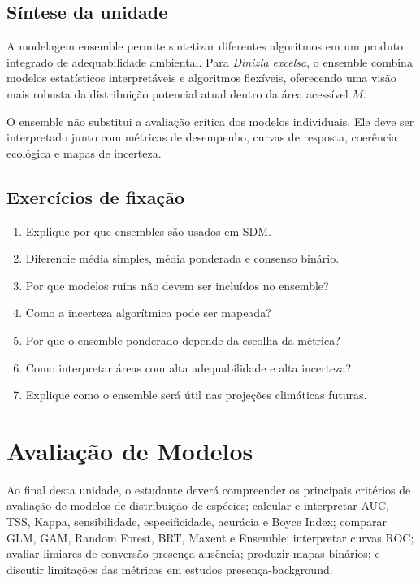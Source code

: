 \documentclass{ueap-sdm}
\begin{document}
\section{Síntese da unidade}

A modelagem ensemble permite sintetizar diferentes algoritmos em um produto integrado de adequabilidade ambiental. Para \textit{Dinizia excelsa}, o ensemble combina modelos estatísticos interpretáveis e algoritmos flexíveis, oferecendo uma visão mais robusta da distribuição potencial atual dentro da área acessível \(M\).

\begin{conceito}[title={\faBook\quad Mensagem central}]
	O ensemble não substitui a avaliação crítica dos modelos individuais. Ele deve ser interpretado junto com métricas de desempenho, curvas de resposta, coerência ecológica e mapas de incerteza.
\end{conceito}

\section{Exercícios de fixação}

\begin{enumerate}
	\item Explique por que ensembles são usados em SDM.
	\item Diferencie média simples, média ponderada e consenso binário.
	\item Por que modelos ruins não devem ser incluídos no ensemble?
	\item Como a incerteza algorítmica pode ser mapeada?
	\item Por que o ensemble ponderado depende da escolha da métrica?
	\item Como interpretar áreas com alta adequabilidade e alta incerteza?
	\item Explique como o ensemble será útil nas projeções climáticas futuras.
\end{enumerate}


\chapter[Avaliação de modelos]{Avaliação de Modelos}

\begin{objetivos}
	Ao final desta unidade, o estudante deverá compreender os principais critérios de avaliação de modelos de distribuição de espécies; calcular e interpretar AUC, TSS, Kappa, sensibilidade, especificidade, acurácia e Boyce Index; comparar GLM, GAM, Random Forest, BRT, Maxent e Ensemble; interpretar curvas ROC; avaliar limiares de conversão presença-ausência; produzir mapas binários; e discutir limitações das métricas em estudos presença-background.
\end{objetivos}
\end{document}
